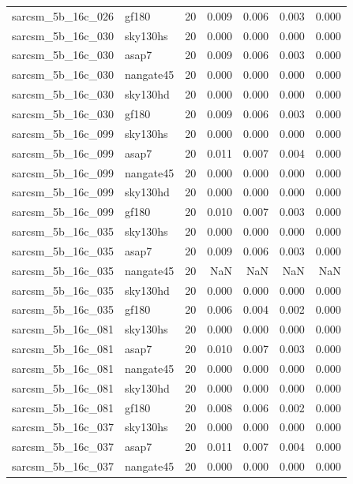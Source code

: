 \begin{tabular}{llrrrrr}
sarcsm\_5b\_16c\_026 & gf180 & 20 & 0.009 & 0.006 & 0.003 & 0.000 \\
sarcsm\_5b\_16c\_030 & sky130hs & 20 & 0.000 & 0.000 & 0.000 & 0.000 \\
sarcsm\_5b\_16c\_030 & asap7 & 20 & 0.009 & 0.006 & 0.003 & 0.000 \\
sarcsm\_5b\_16c\_030 & nangate45 & 20 & 0.000 & 0.000 & 0.000 & 0.000 \\
sarcsm\_5b\_16c\_030 & sky130hd & 20 & 0.000 & 0.000 & 0.000 & 0.000 \\
sarcsm\_5b\_16c\_030 & gf180 & 20 & 0.009 & 0.006 & 0.003 & 0.000 \\
sarcsm\_5b\_16c\_099 & sky130hs & 20 & 0.000 & 0.000 & 0.000 & 0.000 \\
sarcsm\_5b\_16c\_099 & asap7 & 20 & 0.011 & 0.007 & 0.004 & 0.000 \\
sarcsm\_5b\_16c\_099 & nangate45 & 20 & 0.000 & 0.000 & 0.000 & 0.000 \\
sarcsm\_5b\_16c\_099 & sky130hd & 20 & 0.000 & 0.000 & 0.000 & 0.000 \\
sarcsm\_5b\_16c\_099 & gf180 & 20 & 0.010 & 0.007 & 0.003 & 0.000 \\
sarcsm\_5b\_16c\_035 & sky130hs & 20 & 0.000 & 0.000 & 0.000 & 0.000 \\
sarcsm\_5b\_16c\_035 & asap7 & 20 & 0.009 & 0.006 & 0.003 & 0.000 \\
sarcsm\_5b\_16c\_035 & nangate45 & 20 & NaN & NaN & NaN & NaN \\
sarcsm\_5b\_16c\_035 & sky130hd & 20 & 0.000 & 0.000 & 0.000 & 0.000 \\
sarcsm\_5b\_16c\_035 & gf180 & 20 & 0.006 & 0.004 & 0.002 & 0.000 \\
sarcsm\_5b\_16c\_081 & sky130hs & 20 & 0.000 & 0.000 & 0.000 & 0.000 \\
sarcsm\_5b\_16c\_081 & asap7 & 20 & 0.010 & 0.007 & 0.003 & 0.000 \\
sarcsm\_5b\_16c\_081 & nangate45 & 20 & 0.000 & 0.000 & 0.000 & 0.000 \\
sarcsm\_5b\_16c\_081 & sky130hd & 20 & 0.000 & 0.000 & 0.000 & 0.000 \\
sarcsm\_5b\_16c\_081 & gf180 & 20 & 0.008 & 0.006 & 0.002 & 0.000 \\
sarcsm\_5b\_16c\_037 & sky130hs & 20 & 0.000 & 0.000 & 0.000 & 0.000 \\
sarcsm\_5b\_16c\_037 & asap7 & 20 & 0.011 & 0.007 & 0.004 & 0.000 \\
sarcsm\_5b\_16c\_037 & nangate45 & 20 & 0.000 & 0.000 & 0.000 & 0.000 \\

\end{tabular}
